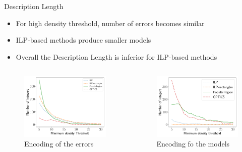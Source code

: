 \documentclass[10pt]{beamer}
\begin{document}
\begin{frame}{Description Length}
    \begin{itemize}
        \item For high density threshold, number of errors becomes similar
        \item ILP-based methods produce smaller models
        \item Overall the Description Length is inferior for ILP-based methods
    \end{itemize}
    \begin{columns}[T, onlytextwidth]

        \begin{figure}
            \centering
            \includegraphics[scale=0.3]{figures/results/error-rate.pdf}
            \caption{Encoding of the errors}
        \end{figure}

        \begin{figure}
            \centering
            \includegraphics[scale=0.3]{figures/results/model-length.pdf}
            \caption{Encoding fo the models}
        \end{figure}
    \end{columns}
\end{frame}
\end{document}
